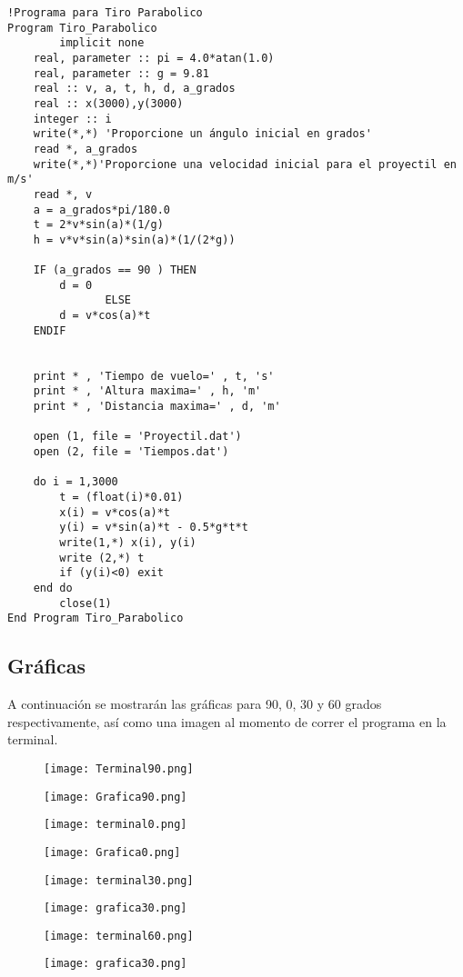 \documentclass[a4paper]{article}
\begin{document}
\begin{verbatim}
!Programa para Tiro Parabolico
Program Tiro_Parabolico
        implicit none
	real, parameter :: pi = 4.0*atan(1.0)
	real, parameter :: g = 9.81
	real :: v, a, t, h, d, a_grados
	real :: x(3000),y(3000)
	integer :: i
	write(*,*) 'Proporcione un ángulo inicial en grados'
	read *, a_grados
	write(*,*)'Proporcione una velocidad inicial para el proyectil en m/s'
	read *, v
	a = a_grados*pi/180.0
	t = 2*v*sin(a)*(1/g)
	h = v*v*sin(a)*sin(a)*(1/(2*g))

	IF (a_grados == 90 ) THEN
		d = 0
               ELSE
  		d = v*cos(a)*t
	ENDIF
      

	print * , 'Tiempo de vuelo=' , t, 's'
	print * , 'Altura maxima=' , h, 'm'
	print * , 'Distancia maxima=' , d, 'm'

	open (1, file = 'Proyectil.dat')
	open (2, file = 'Tiempos.dat')

	do i = 1,3000
		t = (float(i)*0.01)
		x(i) = v*cos(a)*t
		y(i) = v*sin(a)*t - 0.5*g*t*t
		write(1,*) x(i), y(i)
		write (2,*) t
		if (y(i)<0) exit
	end do
        close(1)
End Program Tiro_Parabolico
\end{verbatim}

\subsection{Gráficas}
A continuación se mostrarán las gráficas para 90, 0, 30 y 60 grados respectivamente, así como una imagen al momento de correr el programa en la terminal.


\begin{figure}[H]
\centering
\texttt{[image: Terminal90.png]}
\end{figure}

\begin{figure}
\centering
\texttt{[image: Grafica90.png]}
\end{figure}


\begin{figure}
\centering
\texttt{[image: terminal0.png]}
\end{figure}

\begin{figure}
\centering
\texttt{[image: Grafica0.png]}
\end{figure}


\begin{figure}
\centering
\texttt{[image: terminal30.png]}
\end{figure}

\begin{figure}
\centering
\texttt{[image: grafica30.png]}
\end{figure}


\begin{figure}
\centering
\texttt{[image: terminal60.png]}
\end{figure}

\begin{figure}
\centering
\texttt{[image: grafica30.png]}
\end{figure}
\end{document}
